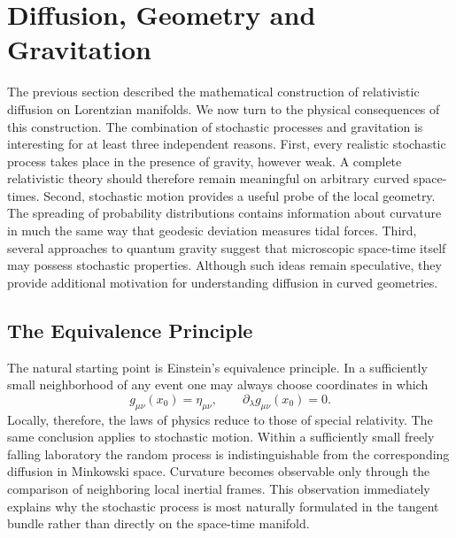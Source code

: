 \section{Diffusion, Geometry and Gravitation}
\label{sec:DiffusionGravity}
The previous section described the mathematical construction of
relativistic diffusion on Lorentzian manifolds.
We now turn to the physical consequences of this construction.
The combination of stochastic processes and gravitation is interesting
for at least three independent reasons.
First, every realistic stochastic process takes place in the presence of
gravity, however weak.
A complete relativistic theory should therefore remain meaningful on
arbitrary curved space-times.
Second, stochastic motion provides a useful probe of the local geometry.
The spreading of probability distributions contains information about
curvature in much the same way that geodesic deviation measures tidal
forces.
Third, several approaches to quantum gravity suggest that microscopic
space-time itself may possess stochastic properties.
Although such ideas remain speculative, they provide additional
motivation for understanding diffusion in curved geometries.
\subsection{The Equivalence Principle}
The natural starting point is Einstein's equivalence principle.
In a sufficiently small neighborhood of any event one may always choose
coordinates in which
\begin{equation}
g_{\mu\nu}(x_0)=\eta_{\mu\nu},\qquad\partial_\lambda g_{\mu\nu}(x_0)=0.
\end{equation}
Locally, therefore, the laws of physics reduce to those of special
relativity.
The same conclusion applies to stochastic motion.
Within a sufficiently small freely falling laboratory the random process
is indistinguishable from the corresponding diffusion in Minkowski
space.
Curvature becomes observable only through the comparison of neighboring
local inertial frames.
This observation immediately explains why the stochastic process is most
naturally formulated in the tangent bundle rather than directly on the
space-time manifold.
